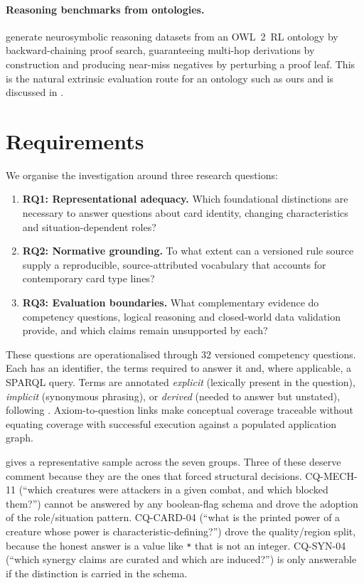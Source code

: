 \documentclass[11pt,a4paper]{article}
\begin{document}
\paragraph{Reasoning benchmarks from ontologies.} \citet{vanschependom2026synthology} generate neurosymbolic reasoning datasets from an OWL~2~RL ontology by backward-chaining proof search, guaranteeing multi-hop derivations by construction and producing near-miss negatives by perturbing a proof leaf. This is the natural extrinsic evaluation route for an ontology such as ours and is discussed in .

\section{Requirements}
\label{sec:requirements}

We organise the investigation around three research questions:
\begin{enumerate}[leftmargin=1.4em, itemsep=2pt]
  \item \textbf{RQ1: Representational adequacy.} Which foundational distinctions are necessary to answer questions about card identity, changing characteristics and situation-dependent roles?
  \item \textbf{RQ2: Normative grounding.} To what extent can a versioned rule source supply a reproducible, source-attributed vocabulary that accounts for contemporary card type lines?
  \item \textbf{RQ3: Evaluation boundaries.} What complementary evidence do competency questions, logical reasoning and closed-world data validation provide, and which claims remain unsupported by each?
\end{enumerate}

These questions are operationalised through 32 versioned competency questions. Each has an identifier, the terms required to answer it and, where applicable, a SPARQL query. Terms are annotated \emph{explicit} (lexically present in the question), \emph{implicit} (synonymous phrasing), or \emph{derived} (needed to answer but unstated), following \citet{cq4oe2026}. Axiom-to-question links make conceptual coverage traceable without equating coverage with successful execution against a populated application graph.

 gives a representative sample across the seven groups. Three of these deserve comment because they are the ones that forced structural decisions. CQ-MECH-11 (``which creatures were attackers in a given combat, and which blocked them?'') cannot be answered by any boolean-flag schema and drove the adoption of the role/situation pattern. CQ-CARD-04 (``what is the printed power of a creature whose power is characteristic-defining?'') drove the quality/region split, because the honest answer is a value like \texttt{*} that is not an integer. CQ-SYN-04 (``which synergy claims are curated and which are induced?'') is only answerable if the distinction is carried in the schema.
\end{document}
